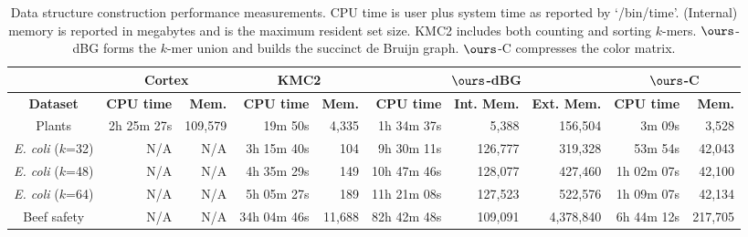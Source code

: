 \documentclass[doctor]{thesis}
\begin{document}
    
        \begin{table}

      \small
   \centering
   \begin{tabular}{|c|r|r|r|r|r|r|r|r|r|}

     \hline
      	\multicolumn{1}{|l}{}
   	& \multicolumn{2}{|c|}{{\sc Cortex}}	
	& \multicolumn{2}{|c|}{KMC2} 
	& \multicolumn{3}{|c|}{$\ours$-dBG} 
	& \multicolumn{2}{|c|}{$\ours$-C}  \\
        \hline
            {\bf Dataset} & {\bf CPU time} & {\bf Mem.} & {\bf CPU time} & {\bf Mem.} &{\bf CPU time} & {\bf Int. Mem.} & {\bf Ext. Mem.} & {\bf CPU time} & {\bf Mem.}  \\
            \hline
            Plants & 2h 25m 27s & 109,579 &  19m 50s & 4,335 & 1h 34m 37s & 5,388 & 156,504 & 3m 09s & 3,528 \\
    


    
    \emph{E. coli} ($k$=32)         & N/A & N/A & 3h 15m 40s & 104 & 9h 30m 11s & 126,777 & 319,328 &  53m 54s & 42,043 \\



    \emph{E. coli} ($k$=48)         & N/A & N/A & 4h 35m 29s & 149 & 10h 47m 46s & 128,077 & 427,460 & 1h 02m 07s & 42,100 \\


    \emph{E. coli} ($k$=64)         & N/A & N/A & 5h 05m 27s & 189 & 11h 21m 08s & 127,523 & 522,576 & 1h 09m 07s & 42,134 \\

    Beef safety & N/A & N/A & 34h 04m 46s & 11,688 & 82h 42m 48s & 109,091 & 4,378,840 & 6h 44m 12s & 217,705 \\

        \hline
   \end{tabular}
       \caption{Data structure construction performance measurements.  CPU time is user plus system time as reported by `/bin/time'.  (Internal) memory is reported in megabytes and is the maximum resident set size. KMC2 includes both counting and sorting $k$-mers. $\ours$-dBG forms the $k$-mer union and builds the succinct de Bruijn graph. $\ours$-C compresses the color matrix.}
  \label{tbl-buildper}

      \end{table}





    

    
\end{document}
